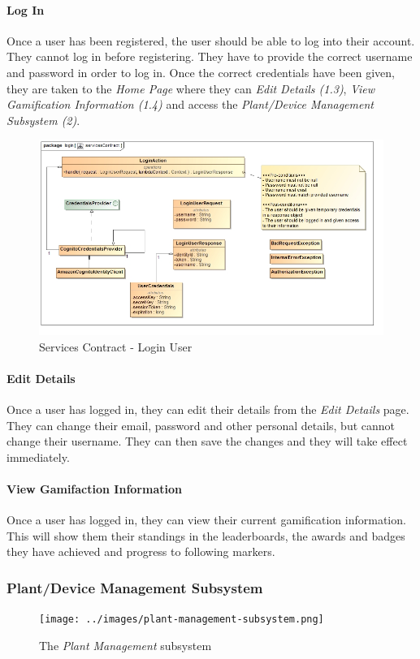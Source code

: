 \documentclass{article}
\let\cleardoublepage\clearpage
\begin{document}
\cleardoublepage
		\paragraph{Log In}
			Once a user has been registered, the user should be able to log into their account. They cannot log in before registering. They have to provide the correct username and password in order to log in. Once the correct credentials have been given, they are taken to the \emph{Home Page} where they can \emph{Edit Details (1.3)}, \emph{View Gamification Information (1.4)} and access the \emph{Plant/Device Management Subsystem (2)}.
			\begin{figure}[H]
				\includegraphics[width=\linewidth]{../images/ServicesContracts/login.jpg}
				\caption{Services Contract - Login User}
			\end{figure}
		\paragraph{Edit Details}
			Once a user has logged in, they can edit their details from the \emph{Edit Details} page. They can change their email, password and other personal details, but cannot change their username. They can then save the changes and they will take effect immediately.
		\paragraph{View Gamifaction Information}
			Once a user has logged in, they can view their current gamification information. This will show them their standings in the leaderboards, the awards and badges they have achieved and progress to following markers.			
	
\cleardoublepage
		\subsubsection{Plant/Device Management Subsystem}
			\begin{figure}[H]
				\centering
				\texttt{[image: ../images/plant-management-subsystem.png]}
				\caption{The \emph{Plant Management} subsystem}
			\end{figure}
\end{document}
